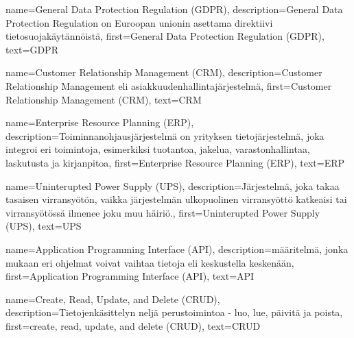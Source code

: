 %
%
%

\makeglossaries



    {
    name={General Data Protection Regulation (GDPR)},
	description={General Data Protection Regulation on Euroopan unionin asettama direktiivi tietosuojakäytännöistä},
	first={General Data Protection Regulation (GDPR)},
	text={GDPR}
    }

    {
	name={Customer Relationship Management (CRM)},
	description={Customer Relationship Management eli asiakkuudenhallintajärjestelmä},
	first={Customer Relationship Management (CRM)},
	text={CRM}
    }

    {
    name={Enterprise Resource Planning (ERP)},
    description={Toiminnanohjausjärjestelmä on yrityksen tietojärjestelmä, joka integroi eri toimintoja, esimerkiksi tuotantoa, jakelua, varastonhallintaa, laskutusta ja kirjanpitoa},
    first={Enterprise Resource Planning (ERP)},
    text={ERP}
    }

    {
    name={Uninterupted Power Supply (UPS)},
    description={Järjestelmä, joka takaa tasaisen virransyötön, vaikka järjestelmän ulkopuolinen virransyöttö katkeaisi tai virransyötössä ilmenee joku muu häiriö.},
    first={Uninterupted Power Supply (UPS)},
    text={UPS}
    }

    {
    name={Application Programming Interface (API)},
    description={määritelmä, jonka mukaan eri ohjelmat voivat vaihtaa tietoja eli keskustella keskenään},
    first={Application Programming Interface (API)},
    text={API}
    }

    {
    name={Create, Read, Update, and Delete (CRUD)},
    description={Tietojenkäsittelyn neljä perustoimintoa - luo, lue, päivitä ja poista},
    first={create, read, update, and delete (CRUD)},
    text={CRUD}
    }

